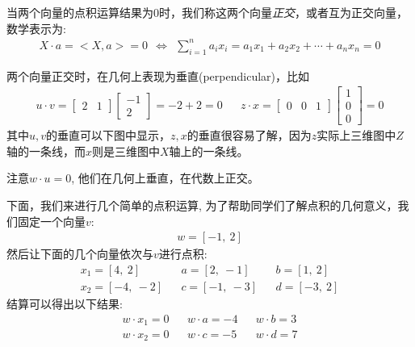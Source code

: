 \documentclass[12pt]{article}
\numberwithin{figure}{section}
\numberwithin{equation}{section}
\begin{document}
\begin{definition}
	当两个向量的点积运算结果为$0$时，我们称这两个向量\textit{正交}，或者互为正交向量，数学表示为:
	\begin{align*}
		 X \cdot a = <X, a> = 0 \ \ \Leftrightarrow \ \ \sum_{i=1}^n a_i x_i = a_1 x_1 + a_2 x_2 + \cdots + a_n x_n = 0 
	\end{align*}
\end{definition}
\begin{remark}
两个向量正交时，在几何上表现为垂直(perpendicular)，比如
\begin{align*}
	u \cdot v = \begin{bmatrix}
		2 & 1 
	\end{bmatrix} \begin{bmatrix}
		-1 \\
		2
	\end{bmatrix} = -2 + 2 = 0 & &  z \cdot x = \begin{bmatrix}
		0 & 0 & 1
	\end{bmatrix} \begin{bmatrix}
		1 \\
		0 \\
		0
	\end{bmatrix} = 0 
\end{align*}	
其中$u, v$的垂直可以下图中显示，$z, x$的垂直很容易了解，因为$z$实际上三维图中$Z$轴的一条线，而$x$则是三维图中$X$轴上的一条线。
\begin{figure}[H]
	\centering
\end{figure}
注意$w\cdot u=0$, 他们在几何上垂直，在代数上正交。
\end{remark}

\begin{example}
下面，我们来进行几个简单的点积运算, 为了帮助同学们了解点积的几何意义，我们固定一个向量$v$:
\begin{align*}
	 w = [-1, \ 2] 
\end{align*}	
然后让下面的几个向量依次与$v$进行点积:
\begin{align*}
	x_1 = [4, \ 2] & & a = [2, \ -1] & & b  = [1, \ 2] \\
x_2 = [-4, \ -2] & & c = [-1, \ -3] & & d = [-3, \ 2 ]
\end{align*}
结算可以得出以下结果:
\begin{align*}
	w\cdot x_1  =0 & & w \cdot  a = -4  & & w \cdot b  =  3 \\
w \cdot x_2 = 0 & & w \cdot c = -5  & & w \cdot d  = 7 \end{align*}
\end{example}
\end{document}
